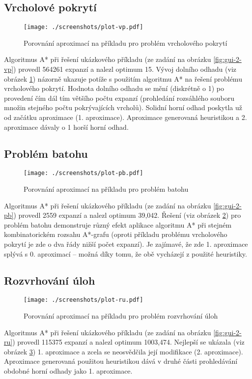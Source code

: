 \documentclass[12pt,notitlepage,fleqn]{report} %
\theoremstyle{definition}
\begin{document}
\subsection{Vrcholové pokrytí}
\begin{figure}[h]
 \centering
 \texttt{[image: ./screenshots/plot-vp.pdf]}
 \caption{Porovnání aproximací na příkladu pro problém vrcholového pokrytí}
 \label{fig:plot-vp}
\end{figure}
Algoritmus A* při řešení ukázkového příkladu (ze zadání na obrázku \ref{fig:gui-2-vp}) provedl 564261 expanzí a nalezl optimum 15.
Vývoj dolního odhadu (viz obrázek \ref{fig:plot-vp}) názorně ukazuje potíže s použitím algoritmu A* na řešení problému vrcholového pokrytí. Hodnota dolního odhadu se mění (diskrétně o 1) po provedení čím dál tím většího počtu expanzí (prohledání rozsáhlého souboru množin stejného počtu pokrývajících vrcholů). Solidní horní odhad poskytla už od začátku  aproximace (1. aproximace). Aproximace generovaná heuristikou a 2. aproximace dávaly o 1 horší horní odhad.

\subsection{Problém batohu}
\begin{figure}[!]
 \centering
 \texttt{[image: ./screenshots/plot-pb.pdf]}
 \caption{Porovnání aproximací na příkladu pro problém batohu}
 \label{fig:plot-pb}
\end{figure}
Algoritmus A* při řešení ukázkového příkladu (ze zadání na obrázku \ref{fig:gui-2-pb}) provedl 2559 expanzí a nalezl optimum 39,042.
Řešení (viz obrázek \ref{fig:plot-pb}) pro problém batohu demonstruje různý efekt aplikace algoritmu A* při stejném kombinatorickém rozsahu A*-grafu (oproti příkladu problému vrcholového pokrytí je zde o dva řády nižší počet expanzí). Je zajímavé, že zde 1. aproximace splývá s 0. aproximací -- možná díky tomu, že obě vycházejí z použité heuristiky.

\subsection{Rozvrhování úloh}
\begin{figure}[h]
 \centering
 \texttt{[image: ./screenshots/plot-ru.pdf]}
 \caption{Porovnání aproximací na příkladu pro problém rozvrhování úloh}
 \label{fig:plot-ru}
\end{figure}
Algoritmus A* při řešení ukázkového příkladu (ze zadání na obrázku \ref{fig:gui-2-ru}) provedl 115375 expanzí a nalezl optimum 1003,474.
Nejlepší se ukázala (viz obrázek \ref{fig:plot-ru}) 1. aproximace a zcela se neosvědčila její modifikace (2. aproximace). Aproximace generovaná použitou heuristikou dává v druhé části prohledávání obdobné horní odhady jako 1. aproximace.
\end{document}
